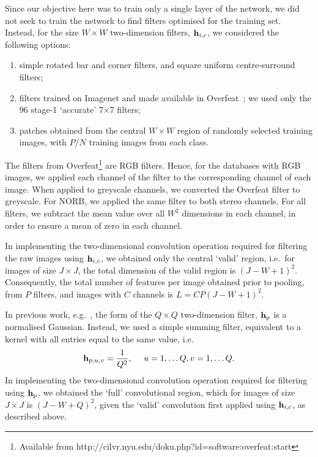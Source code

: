 \documentclass[conference]{IEEEtran}
\begin{document}
Since our objective here was to train only a single layer of the network, we did not seek to train the network to find filters optimised for the training set. Instead, for the size $W\times W$ two-dimension filters, ${\bf h}_{i,c}$, we considered the following options:
\begin{enumerate}
\item simple rotated bar and corner filters, and square uniform centre-surround filters;
\item filters trained on Imagenet and made available in Overfeat~\cite{Sermanet.14_overfeat}; we used only the 96 stage-1 `accurate' 7$\times$7 filters;
\item patches obtained  from the central $W\times W$ region of randomly selected training images, with $P/N$ training images from each class.
\end{enumerate}
The  filters from Overfeat\footnote{Available from http://cilvr.nyu.edu/doku.php?id=software:overfeat:start} are RGB filters. Hence, for the databases with RGB images, we applied each channel of the filter to the corresponding channel of each image. When applied to greyscale channels, we converted the Overfeat filter to greyscale. For NORB, we applied the same filter to both stereo channels. For all filters, we subtract the mean value over all $W^2$ dimensions in each channel, in order to ensure a mean of zero in each channel.

In implementing the two-dimensional convolution operation required for filtering the raw images using ${\bf h}_{i,c}$, we obtained only the central `valid' region, i.e.~for images of size $J\times J$, the total dimension of the valid region is $(J-W+1)^2$. Consequently, the total number of features per image obtained prior to pooling, from $P$ filters, and images with $C$ channels is $L= CP(J-W+1)^2$.


In previous work, e.g.~\cite{Sermanet.12}, the form of the $Q\times Q$ two-dimension filter, ${\bf h}_{\rm p}$ is a normalised Gaussian. Instead, we used a simple summing filter, equivalent to a kernel with all entries equal to the same value, i.e.
\begin{equation}\label{h_pool}
{\bf h}_{{\rm p},u,v}=\frac{1}{Q^2},\quad~u=1,\dots Q, v=1,\dots Q.
\end{equation}
In implementing the two-dimensional convolution operation required for filtering using ${\bf h}_{{\rm p}}$, we obtained the `full' convolutional region, which for images of size $J\times J$ is $(J-W+Q)^2$, given the `valid' convolution first applied using ${\bf h}_{i,c}$, as described above.
\end{document}

